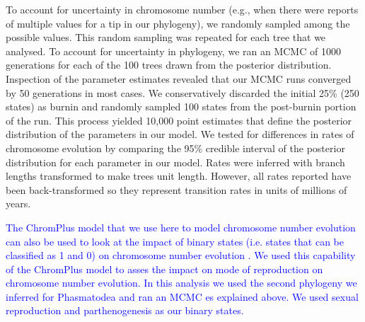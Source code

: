 \documentclass[]{rsos}%
\begin{document}
To account for uncertainty in chromosome number (e.g., when there were reports of multiple values for a tip in our phylogeny), we randomly sampled among the possible values.
This random sampling was repeated for each tree that we analysed.
To account for uncertainty in phylogeny, we ran an MCMC of 1000 generations for each of the 100 trees drawn from the posterior distribution.
Inspection of the parameter estimates revealed that our MCMC runs converged by 50 generations in most cases.  
We conservatively discarded the initial 25\% (250 states) as burnin and randomly sampled 100 states from the post-burnin portion of the run. 
This process yielded 10,000 point estimates that define the posterior distribution of the parameters in our model.
We tested for differences in rates of chromosome evolution by comparing the 95\% credible interval of the posterior distribution for each parameter in our model.
Rates were inferred with branch lengths transformed to make trees unit length.
However, all rates reported have been back-transformed so they represent transition rates in units of millions of years.

\textcolor{blue}{The ChromPlus model that we use here to model chromosome number evolution can also be used to look at the impact of binary states (i.e. states that can be classified as 1 and 0) on chromosome number evolution \cite{blackmon2019meiotic}. We used this capability of the ChromPlus model to asses the impact on mode of reproduction on chromosome number evolution. In this analysis we used the second phylogeny we inferred for Phasmatodea and ran an MCMC es explained above. We used sexual reproduction and parthenogenesis as our binary states.}
\end{document}

